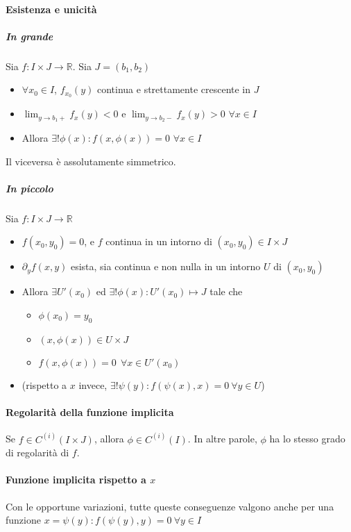 \documentclass[a4paper,12pt]{book}
\begin{document}
\paragraph{Esistenza e unicità}
\subparagraph{In grande}
Sia $f: I \times J \rightarrow \mathbb{R}$. Sia $J = (b_1, b_2)$
\begin{itemize}
 \item $\forall x_0 \in I$, $f_{x_0}(y) $ continua e strettamente crescente in $J$
 \item $\displaystyle\lim_{y \to b_1+}f_x(y) < 0$ e $\displaystyle\lim_{y \to b_2-} f_x(y) > 0$ $\forall x \in I$
 \item Allora $\exists ! \phi(x): f(x, \phi(x)) = 0$ $\forall x \in I$
\end{itemize}
Il viceversa è assolutamente simmetrico.
\subparagraph{In piccolo}
Sia $f: I \times J \rightarrow \mathbb{R}$
\begin{itemize}
 \item $f(x_0, y_0) = 0$, e $f$ continua in un intorno di $(x_0, y_0) \in I\times J$
 \item $\partial_y f(x, y)$ esista, sia continua e non nulla in un intorno $U$ di $(x_0, y_0)$
 \item Allora $\exists U'(x_0)$ ed $\exists ! \phi(x): U'(x_0) \mapsto J$ tale che
 \begin{itemize}
 \item $ \phi(x_0)= y_0$
 \item $ (x, \phi(x)) \in U\times J $
 \item $f(x, \phi(x)) = 0 \ \ \forall x \in U'(x_0)$
 \end{itemize}
 \item (rispetto a $x$ invece, $\exists ! \psi(y): f(\psi(x), x) = 0\ \forall y \in U$)
\end{itemize}

\paragraph{Regolarità della funzione implicita}
Se $f\in C^{(i)} (I \times J)$, allora $\phi\in C^{(i)}(I)$. In altre parole, $\phi$ ha lo stesso grado di regolarità di $f$.

\paragraph{Funzione implicita rispetto a $x$}
Con le opportune variazioni, tutte queste conseguenze valgono anche per una funzione $x = \psi(y): f(\psi(y), y) = 0\ \forall y \in I$
\end{document}
